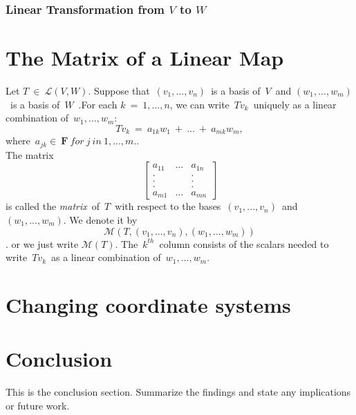\documentclass[12pt]{article} %
\begin{document}
\subsubsection{Linear Transformation from $V$ to $W$}



\section{The Matrix of a Linear Map}
Let $T\ \in\ \mathcal{L}(V,W)$. Suppose that\ $(v_{1},...,v_{n})$\ is a basis of\ $V$\ and 
$(w_{1},...,w_{m})$\ is a basis of\ $W$\ .For each $k\ =\ 1,...,n$, we can write\ $Tv_{k}$\ 
uniquely as a linear combination of\ $w_{1},...,w_{m}$: 
$$Tv_{k}\ =\ a_{1k}w_{1}\ +\ ...\ +\ a_{mk}w_{m},$$
where\ $a_{jk}\in\ \mathbf{F}\ for\ j\ in\ 1,...,m.$.\\
The matrix
$$
\begin{bmatrix}
a_{11} &  ... & a_{1n}\\
.& &.\\
.& &.\\
.& &.\\
a_{m1} & ... & a_{mn}
\end{bmatrix}
$$
is called the \textit{matrix}\ of\ $T$\ with respect to the 
bases\ $(v_{1},...,v_{n})$\ and\ $(w_{1},...,w_{m})$.
We denote it by 
$$\mathcal{M}(T,(v_{1},...,v_{n}),(w_{1},...,w_{m}))$$.
or we just write $\mathcal{M}(T)$. The\ $k^{th}$\ column consists of the 
scalars needed to write\ $Tv_{k}$\ as a linear combination of\ $w_{1},...,w_{m}$. \\

\section{Changing coordinate systems}



\section{Conclusion}
This is the conclusion section. Summarize the findings and state any implications or future work.
\end{document}
